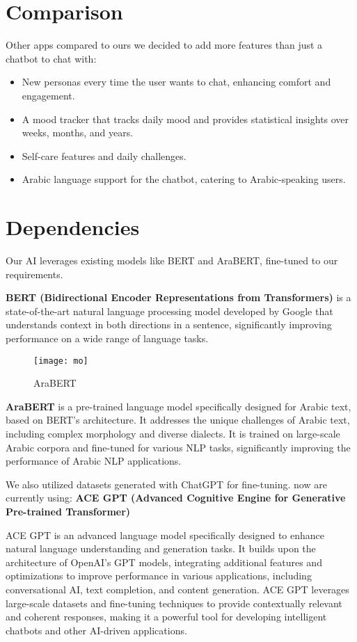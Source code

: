 \section{Comparison}
Other apps compared to ours we decided to add more features than just a chatbot to chat with:
\begin{itemize}
    \item New personas every time the user wants to chat, enhancing comfort and engagement.
    \item A mood tracker that tracks daily mood and provides statistical insights over weeks, months, and years.
    \item Self-care features and daily challenges.
    \item Arabic language support for the chatbot, catering to Arabic-speaking users.
\end{itemize}

\section{Dependencies}
Our AI leverages existing models like BERT and AraBERT, fine-tuned to our requirements. 

\textbf{BERT (Bidirectional Encoder Representations from Transformers)} is a state-of-the-art natural language processing model developed by Google that understands context in both directions in a sentence, significantly improving performance on a wide range of language tasks.

\begin{figure}
    \centering
    \texttt{[image: mo]}
    \caption{AraBERT}
\end{figure}

\textbf{AraBERT} is a pre-trained language model specifically designed for Arabic text, based on BERT's architecture. It addresses the unique challenges of Arabic text, including complex morphology and diverse dialects. It is trained on large-scale Arabic corpora and fine-tuned for various NLP tasks, significantly improving the performance of Arabic NLP applications.

We also utilized datasets generated with ChatGPT for fine-tuning.
now are currently using:
\textbf{ACE GPT (Advanced Cognitive Engine for Generative Pre-trained Transformer)}

ACE GPT is an advanced language model specifically designed to enhance natural language understanding and generation tasks. It builds upon the architecture of OpenAI's GPT models, integrating additional features and optimizations to improve performance in various applications, including conversational AI, text completion, and content generation. ACE GPT leverages large-scale datasets and fine-tuning techniques to provide contextually relevant and coherent responses, making it a powerful tool for developing intelligent chatbots and other AI-driven applications.

